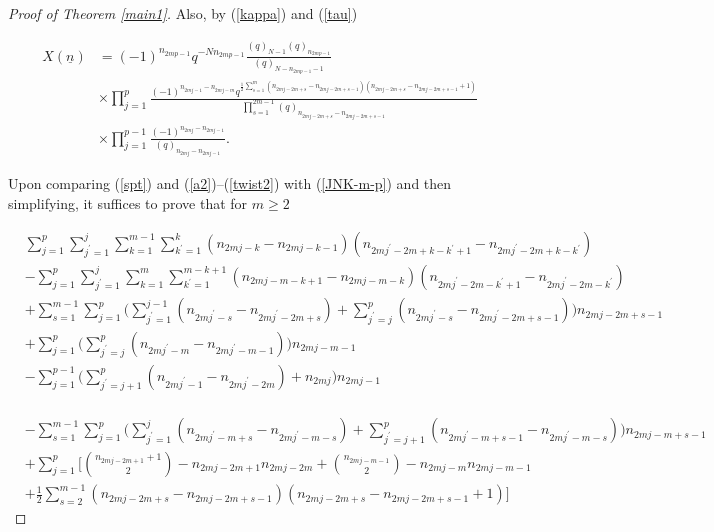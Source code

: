 \documentclass[11pt,reqno]{amsart}
\theoremstyle{definition}
\numberwithin{equation}{section}
\begin{document}
\begin{proof}[Proof of Theorem \ref{main1}]
\noindent Also, by (\ref{kappa}) and (\ref{tau})

\begin{equation} \label{twist2}
\begin{aligned}
X({\underline{n}}) & = (-1)^{n_{2mp - 1}} q^{-Nn_{2mp - 1}} \frac{(q)_{N-1} (q)_{n_{2mp - 1}}}{(q)_{N - n_{2mp - 1} - 1}} \\
& \times \prod_{j=1}^{p} \frac{(-1)^{n_{2mj - 1} - n_{2mj-m}} q^{\frac{1}{2} \sum\limits_{s=1}^{m} (n_{2mj-2m+s} - n_{2mj-2m+s-1})(n_{2mj-2m+s} - n_{2mj-2m+s-1} + 1)}}{\displaystyle \prod\limits_{s=1}^{2m-1} (q)_{n_{2mj-2m+s} - n_{2mj-2m+s-1}}} \\
& \times \prod_{j=1}^{p- 1} \frac{(-1)^{n_{2mj} - n_{2mj-1}}}{(q)_{n_{2mj} - n_{2mj-1}}}.
\end{aligned}
\end{equation}

\noindent Upon comparing (\ref{spt}) and (\ref{a2})--(\ref{twist2}) with (\ref{JNK-m-p}) and then simplifying, it suffices to prove that for $m \geq 2$
 
\begin{equation*}
\begin{aligned}
& \sum_{j=1}^{p} \sum_{j^{\prime}=1}^{j} \sum_{k=1}^{m-1} \sum_{k^{\prime}=1}^{k} 
(n_{2mj - k} - n_{2mj - k - 1})(n_{2mj^{\prime} - 2m + k - k^{\prime} + 1} - n_{2mj^{\prime} - 2m + k - k^{\prime}}) \\
& - \sum_{j=1}^{p} \sum_{j^{\prime}=1}^{j} \sum_{k=1}^{m} \sum_{k^{\prime}=1}^{m-k+1} 
(n_{2mj - m - k + 1} - n_{2mj - m - k})(n_{2mj^{\prime} - 2m - k^{\prime} + 1} - n_{2mj^{\prime} - 2m - k^{\prime}}) \\
& + \sum_{s=1}^{m-1} \sum_{j=1}^{p} \Biggl( \sum_{j^{\prime} = 1}^{j-1} (n_{2mj^{\prime} - s} - n_{2mj^{\prime} - 2m + s}) + \sum_{j^{\prime}=j}^{p} (n_{2mj^{\prime} - s} - n_{2mj^{\prime} - 2m + s-1} ) \Biggr) n_{2mj - 2m + s-1} \\
& + \sum_{j=1}^{p} \Biggl( \sum_{j^{\prime}=j}^{p} (n_{2mj^{\prime} - m} - n_{2mj^{\prime} - m -1}) \Biggr) n_{2mj - m - 1} \\
& - \sum_{j=1}^{p - 1} \Biggl( \sum_{j^{\prime} = j+1}^{p} (n_{2mj^{\prime} - 1} - n_{2mj^{\prime} - 2m} ) + n_{2mj} \Biggr) n_{2mj - 1} \\
\end{aligned}
\end{equation*}

\begin{equation} \label{lhs}
\begin{aligned}
& - \sum_{s=1}^{m-1} \sum_{j=1}^{p} \Biggl( \sum_{j^{\prime}=1}^{j} (n_{2mj^{\prime} - m + s} - n_{2mj^{\prime} - m - s}) + \sum_{j^{\prime}=j+1}^{p} (n_{2mj^{\prime} - m + s-1} - n_{2mj^{\prime} - m - s}) \Biggr) n_{2mj - m + s - 1} \\
& + \sum_{j=1}^{p} \Biggl[ \binom{n_{2mj-2m+1} + 1}{2} - n_{2mj-2m+1} n_{2mj-2m} + \binom{n_{2mj-m-1}}{2} - n_{2mj-m} n_{2mj-m-1} \\
& + \frac{1}{2} \sum_{s=2}^{m-1} (n_{2mj-2m+s} - n_{2mj-2m+s-1})(n_{2mj-2m+s} - n_{2mj-2m+s-1} + 1) \Biggr]
\end{aligned}
\end{equation}


\end{proof}
\end{document}
